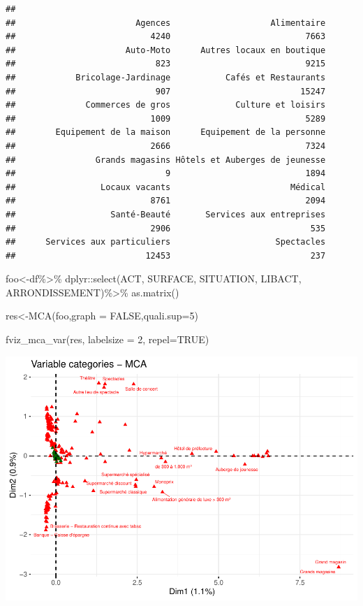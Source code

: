 \documentclass[
]{book}
\newenvironment{Shaded}{\begin{snugshade}}{\end{snugshade}}
\newcommand{\AttributeTok}[1]{\textcolor[rgb]{0.77,0.63,0.00}{#1}}
\newcommand{\ConstantTok}[1]{\textcolor[rgb]{0.00,0.00,0.00}{#1}}
\newcommand{\DecValTok}[1]{\textcolor[rgb]{0.00,0.00,0.81}{#1}}
\newcommand{\FunctionTok}[1]{\textcolor[rgb]{0.00,0.00,0.00}{#1}}
\newcommand{\NormalTok}[1]{#1}
\newcommand{\OtherTok}[1]{\textcolor[rgb]{0.56,0.35,0.01}{#1}}
\newcommand{\SpecialCharTok}[1]{\textcolor[rgb]{0.00,0.00,0.00}{#1}}
\begin{document}
\begin{verbatim}
## 
##                        Agences                    Alimentaire 
##                           4240                           7663 
##                      Auto-Moto      Autres locaux en boutique 
##                            823                           9215 
##            Bricolage-Jardinage           Cafés et Restaurants 
##                            907                          15247 
##              Commerces de gros             Culture et loisirs 
##                           1009                           5289 
##        Equipement de la maison      Equipement de la personne 
##                           2666                           7324 
##                Grands magasins Hôtels et Auberges de jeunesse 
##                              9                           1894 
##                 Locaux vacants                        Médical 
##                           8761                           2094 
##                   Santé-Beauté       Services aux entreprises 
##                           2906                            535 
##      Services aux particuliers                     Spectacles 
##                          12453                            237
\end{verbatim}

\begin{Shaded}
\begin{Highlighting}[]
\NormalTok{foo}\OtherTok{\textless{}{-}}\NormalTok{df}\SpecialCharTok{\%\textgreater{}\%}\NormalTok{ dplyr}\SpecialCharTok{::}\FunctionTok{select}\NormalTok{(ACT, SURFACE, SITUATION, LIBACT, ARRONDISSEMENT)}\SpecialCharTok{\%\textgreater{}\%}
  \FunctionTok{as.matrix}\NormalTok{()}

\NormalTok{res}\OtherTok{\textless{}{-}}\FunctionTok{MCA}\NormalTok{(foo,}\AttributeTok{graph =} \ConstantTok{FALSE}\NormalTok{,}\AttributeTok{quali.sup=}\DecValTok{5}\NormalTok{)}


\FunctionTok{fviz\_mca\_var}\NormalTok{(res, }\AttributeTok{labelsize =} \DecValTok{2}\NormalTok{, }\AttributeTok{repel=}\ConstantTok{TRUE}\NormalTok{)}
\end{Highlighting}
\end{Shaded}

\includegraphics{bookdown-demo_files/figure-latex/0611-1.pdf}
\end{document}
